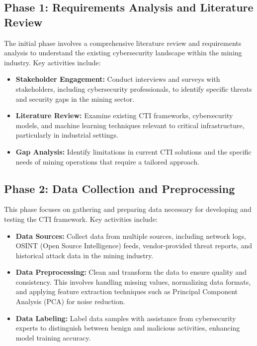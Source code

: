 \documentclass[a4paper,twoside,12pt]{report}
\begin{document}
\subsection{Phase 1: Requirements Analysis and Literature Review}
The initial phase involves a comprehensive literature review and requirements analysis to understand the existing cybersecurity landscape within the mining industry. Key activities include:
\begin{itemize}
    \item \textbf{Stakeholder Engagement:} Conduct interviews and surveys with stakeholders, including cybersecurity professionals, to identify specific threats and security gaps in the mining sector.
    \item \textbf{Literature Review:} Examine existing CTI frameworks, cybersecurity models, and machine learning techniques relevant to critical infrastructure, particularly in industrial settings.
    \item \textbf{Gap Analysis:} Identify limitations in current CTI solutions and the specific needs of mining operations that require a tailored approach.
\end{itemize}

\subsection{Phase 2: Data Collection and Preprocessing}
This phase focuses on gathering and preparing data necessary for developing and testing the CTI framework. Key activities include:
\begin{itemize}
    \item \textbf{Data Sources:} Collect data from multiple sources, including network logs, OSINT (Open Source Intelligence) feeds, vendor-provided threat reports, and historical attack data in the mining industry.
    \item \textbf{Data Preprocessing:} Clean and transform the data to ensure quality and consistency. This involves handling missing values, normalizing data formats, and applying feature extraction techniques such as Principal Component Analysis (PCA) for noise reduction.
    \item \textbf{Data Labeling:} Label data samples with assistance from cybersecurity experts to distinguish between benign and malicious activities, enhancing model training accuracy.
\end{itemize}
\end{document}
